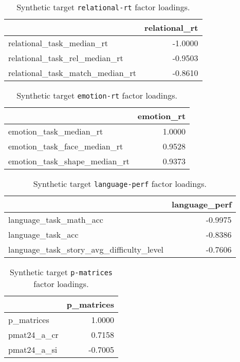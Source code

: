 \documentclass{article}
\begin{document}
\begin{table}
\centering
\begin{tabular}{lr}
\toprule
 & relational\_rt \\
\midrule
relational\_task\_median\_rt & -1.0000 \\
relational\_task\_rel\_median\_rt & -0.9503 \\
relational\_task\_match\_median\_rt & -0.8610 \\
\bottomrule
\end{tabular}

\footnotesize
\caption{Synthetic target \texttt{relational-rt} factor loadings.}
\normalsize
\label{tab:relational-rt}
\end{table}


\begin{table}
\centering
\begin{tabular}{lr}
\toprule
 & emotion\_rt \\
\midrule
emotion\_task\_median\_rt & 1.0000 \\
emotion\_task\_face\_median\_rt & 0.9528 \\
emotion\_task\_shape\_median\_rt & 0.9373 \\
\bottomrule
\end{tabular}

\footnotesize
\caption{Synthetic target \texttt{emotion-rt} factor loadings.}
\normalsize
\label{tab:emotion-rt}
\end{table}


\begin{table}
\centering
\begin{tabular}{lr}
\toprule
 & language\_perf \\
\midrule
language\_task\_math\_acc & -0.9975 \\
language\_task\_acc & -0.8386 \\
language\_task\_story\_avg\_difficulty\_level & -0.7606 \\
\bottomrule
\end{tabular}

\footnotesize
\caption{Synthetic target \texttt{language-perf} factor loadings.}
\normalsize
\label{tab:language-perf}
\end{table}


\begin{table}
\centering
\begin{tabular}{lr}
\toprule
 & p\_matrices \\
\midrule
p\_matrices & 1.0000 \\
pmat24\_a\_cr & 0.7158 \\
pmat24\_a\_si & -0.7005 \\
\bottomrule
\end{tabular}

\footnotesize
\caption{Synthetic target \texttt{p-matrices} factor loadings.}
\normalsize
\label{tab:p-matrices}
\end{table}
\end{document}
